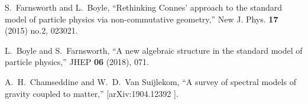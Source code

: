 \documentclass[letterpaper,12pt]{article}
\begin{document}
\begin{thebibliography}{99}
S.~Farnsworth and L.~Boyle,
``Rethinking Connes' approach to the standard model of particle physics via non-commutative geometry,''
New J. Phys. \textbf{17} (2015) no.2, 023021.


L.~Boyle and S.~Farnsworth,
``A new algebraic structure in the standard model of particle physics,''
JHEP \textbf{06} (2018), 071.


A.~H.~Chamseddine and W.~D.~Van Suijlekom,
``A survey of spectral models of gravity coupled to matter,''
[arXiv:1904.12392 ].
















































  








\end{thebibliography}
\end{document}
